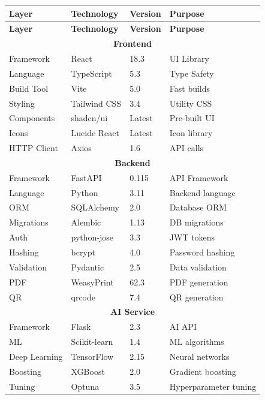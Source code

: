 \documentclass[12pt,a4paper]{report}
\begin{document}
\begin{center}
\begin{longtable}{|l|l|l|l|}
\hline
\textbf{Layer} & \textbf{Technology} & \textbf{Version} & \textbf{Purpose} \\
\hline
\endfirsthead
\hline
\textbf{Layer} & \textbf{Technology} & \textbf{Version} & \textbf{Purpose} \\
\hline
\endhead
\multicolumn{4}{|c|}{\textbf{Frontend}} \\
\hline
Framework & React & 18.3 & UI Library \\
\hline
Language & TypeScript & 5.3 & Type Safety \\
\hline
Build Tool & Vite & 5.0 & Fast builds \\
\hline
Styling & Tailwind CSS & 3.4 & Utility CSS \\
\hline
Components & shadcn/ui & Latest & Pre-built UI \\
\hline
Icons & Lucide React & Latest & Icon library \\
\hline
HTTP Client & Axios & 1.6 & API calls \\
\hline
\multicolumn{4}{|c|}{\textbf{Backend}} \\
\hline
Framework & FastAPI & 0.115 & API Framework \\
\hline
Language & Python & 3.11 & Backend language \\
\hline
ORM & SQLAlchemy & 2.0 & Database ORM \\
\hline
Migrations & Alembic & 1.13 & DB migrations \\
\hline
Auth & python-jose & 3.3 & JWT tokens \\
\hline
Hashing & bcrypt & 4.0 & Password hashing \\
\hline
Validation & Pydantic & 2.5 & Data validation \\
\hline
PDF & WeasyPrint & 62.3 & PDF generation \\
\hline
QR & qrcode & 7.4 & QR generation \\
\hline
\multicolumn{4}{|c|}{\textbf{AI Service}} \\
\hline
Framework & Flask & 2.3 & AI API \\
\hline
ML & Scikit-learn & 1.4 & ML algorithms \\
\hline
Deep Learning & TensorFlow & 2.15 & Neural networks \\
\hline
Boosting & XGBoost & 2.0 & Gradient boosting \\
\hline
Tuning & Optuna & 3.5 & Hyperparameter tuning \\

\end{longtable}
\end{center}
\end{document}
